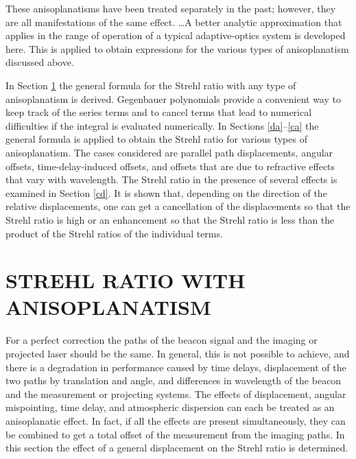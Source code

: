 These  anisoplanatisms have been treated separately in the
past\cite{1,2,3,4,5,6,7}; however,  they are all manifestations of
the same effect. \ldots   A better analytic approximation that
applies in the  range of operation of a typical adaptive-optics
system is developed  here.  This is applied to obtain expressions
for the various types of  anisoplanatism discussed above.


In Section \ref{SR} the general formula  for the Strehl ratio with
any type of anisoplanatism is derived.   Gegenbauer polynomials
provide a convenient way to keep track of the  series terms and to
cancel terms that lead to numerical difficulties if  the integral
is evaluated numerically.  In Sections \ref{da}--\ref{ca}  the
general  formula is applied to obtain the Strehl ratio for various
types of  anisoplanatism.  The cases considered are parallel path
displacements,  angular offsets, time-delay-induced offsets, and
offsets that are due  to refractive effects that vary with
wavelength.  The Strehl ratio in  the presence of several effects
is examined in Section \ref{cd}.  It is shown  that, depending on
the direction of the relative displacements, one can  get a
cancellation of the displacements so that the Strehl ratio is high
or  an enhancement so that the Strehl ratio is less than the
product of the  Strehl ratios of the individual terms.

\section{ STREHL RATIO WITH ANISOPLANATISM}
\label{SR}
For a perfect correction the  paths of the beacon signal and the
imaging or projected laser should be  the same.  In general, this
is not possible to achieve, and there is a  degradation in
performance caused by time delays, displacement of the  two paths
by translation and angle, and differences in wavelength of the
beacon and the measurement or projecting systems.  The effects of
displacement, angular mispointing, time delay, and atmospheric
dispersion can each be treated as an anisoplanatic effect.  In
fact, if  all the effects are present simultaneously, they can be
combined to get  a total offset of the measurement from the imaging
paths.  In this  section the effect of a general displacement on
the Strehl ratio is  determined.

